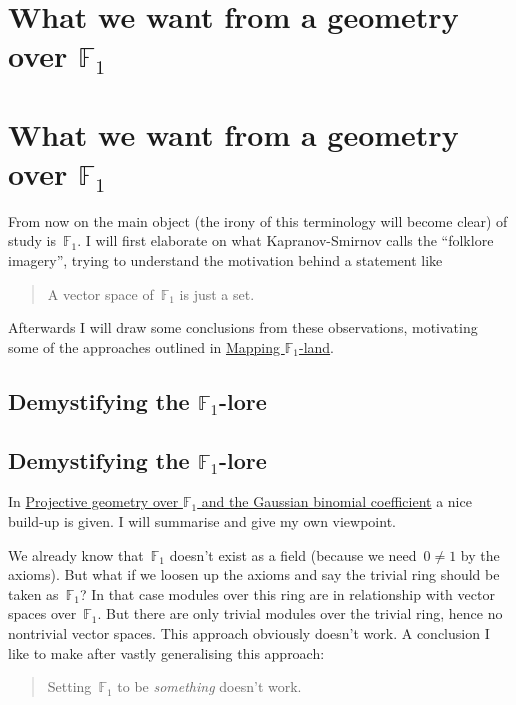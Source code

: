 \iftex
\section{What we want from a geometry over \texorpdfstring{$\mathbb{F}_1$}{F\_1}}
\fi
\ifblog
\section{What we want from a geometry over $\mathbb{F}_1$}
\fi

From now on the main object (the irony of this terminology will become clear) of study is~$\mathbb{F}_1$. I will first elaborate on what Kapranov-Smirnov calls the ``folklore imagery'', trying to understand the motivation behind a statement like

\begin{quote}
  A vector space of~$\mathbb{F}_1$ is just a set.
\end{quote}

Afterwards I will draw some conclusions from these observations, motivating some of the approaches outlined in \iftex\cite{mapping-fun}\fi\ifblog\href{http://www.neverendingbooks.org/index.php/f_un-and-braid-groups.html}{Mapping $\mathbb{F}_1$-land}\fi.


\iftex
\subsection{Demystifying the \texorpdfstring{$\mathbb{F}_1$}{F\_1}-lore}
\fi
\ifblog
\subsection{Demystifying the $\mathbb{F}_1$-lore}
\fi
In \iftex \cite{projective-geometry-over-f1} \fi\ifblog \href{http://arxiv.org/abs/math/0407093}{Projective geometry over $\mathbb{F}_1$ and the Gaussian binomial coefficient} \fi a nice build-up is given. I will summarise and give my own viewpoint.

We already know that~$\mathbb{F}_1$ doesn't exist as a field (because we need~$0\neq 1$ by the axioms). But what if we loosen up the axioms and say the trivial ring should be taken as~$\mathbb{F}_1$? In that case modules over this ring are in relationship with vector spaces over~$\mathbb{F}_1$. But there are only trivial modules over the trivial ring, hence no nontrivial vector spaces. This approach obviously doesn't work. A conclusion I like to make after vastly generalising this approach:

\begin{quote}
  Setting~$\mathbb{F}_1$ to be \emph{something} doesn't work.
\end{quote}

